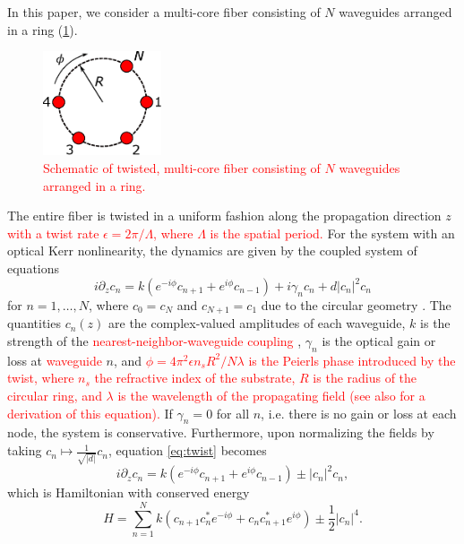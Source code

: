 \documentclass[reprint, amsmath,amssymb,aps,pra]{revtex4-2}
\def\noi{\noindent}
\renewcommand{\revised}[1]{ \textcolor{red}{#1} }
\begin{document}
In this paper, we consider a multi-core fiber consisting of $N$ waveguides arranged in a ring (\cref{fig:ring}).
\begin{figure}
\begin{center}
\includegraphics[width=3.5cm]{circle}
\end{center}
\caption{\revised{Schematic of twisted, multi-core fiber consisting of $N$ waveguides arranged in a ring.}}
\label{fig:ring}
\end{figure}
\noi The entire fiber is twisted in a uniform fashion along the propagation direction $z$ \revised{with a twist rate $\epsilon = 2\pi/\Lambda$, where $\Lambda$ is the spatial period.} For the system with an optical Kerr nonlinearity, the dynamics are given by the coupled system of equations
\begin{equation}\label{eq:twist}
i \partial_z c_n = k \left(e^{-i\phi}c_{n+1} + e^{i\phi}c_{n-1}\right) + i \gamma_n c_n + d |c_n|^2 c_n
\end{equation}
for $n = 1, \dots, N$, where $c_0 = c_{N}$ and $c_{N+1} = c_1$ due to the circular geometry \cite{castro2016,Parto2017}. The quantities $c_n(z)$ are the complex-valued amplitudes of each waveguide, $k$ is the strength of the \revised{nearest-neighbor-waveguide coupling}, $\gamma_n$ is the optical gain or loss at \revised{waveguide} $n$, and \revised{
$\phi = 4 \pi^2 \epsilon n_s R^2/N \lambda$ is the Peierls phase introduced by the twist, where $n_s$ the refractive index of the substrate, $R$ is the radius of the circular ring, and $\lambda$ is the wavelength of the propagating field \cite{castro2016} (see also \cite{Longhi2007b,Garanovich2012} for a derivation of this equation).} If $\gamma_n = 0$ for all $n$, i.e. there is no gain or loss at each node, the system is conservative. Furthermore, upon normalizing the fields by taking $c_n \mapsto \frac{1}{\sqrt{|d|}}c_n$,  equation \cref{eq:twist} becomes
\begin{equation}\label{eq:twist1}
i \partial_z c_n = k \left(e^{-i\phi}c_{n+1} + e^{i\phi}c_{n-1}\right)  \pm |c_n|^2 c_n,
\end{equation}
which is Hamiltonian with conserved energy
\begin{equation}\label{eq:H}
H = \sum_{n=1}^N k (c_{n+1}c_n^* e^{-i \phi} + c_n c_{n+1}^* e^{i \phi}) \pm \frac{1}{2}|c_n|^4.
\end{equation}
\end{document}

